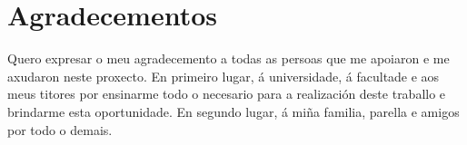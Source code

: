 \chapter*{Agradecementos}

Quero expresar o meu agradecemento a todas as persoas que me apoiaron
e me axudaron neste proxecto. En primeiro lugar, á universidade, á facultade e aos
meus titores por ensinarme todo o necesario para a realización deste traballo e
brindarme esta oportunidade. En segundo lugar, á miña familia, parella e amigos
por todo o demais.